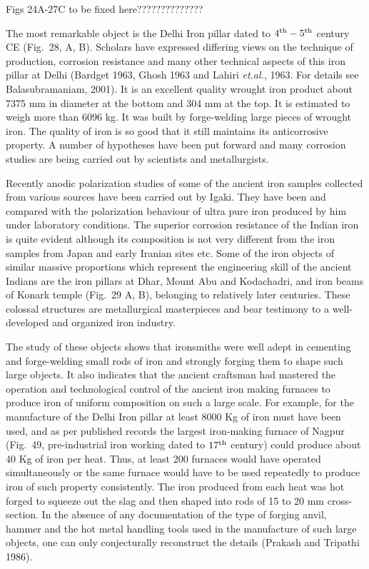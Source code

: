 Figs 24A-27C to be fixed here??????????????


The most remarkable object is the Delhi Iron pillar dated to $4^{\rm th} -5^{\rm th}$ century CE (Fig.~28, A, B). Scholars have expressed differing views on the technique of production, corrosion resistance and many other technical aspects of this iron pillar at Delhi (Bardget 1963, Ghosh 1963 and Lahiri {\it et.al.}, 1963. For details see Balasubramaniam, 2001). It is an excellent quality wrought iron product about 7375 mm in diameter at the bottom and 304 mm at the top. It is estimated to weigh more than 6096 kg. It was built by forge-welding large pieces of wrought iron. The quality of iron is so good that it still maintains its anticorrosive property. A number of hypotheses have been put forward and many corrosion studies are being carried out by scientists and metallurgists. 

Recently anodic polarization studies of some of the ancient iron samples collected from various sources have been carried out by Igaki. They have been and compared with the polarization behaviour of ultra pure iron produced by him under laboratory conditions. The superior corrosion resistance of the Indian iron is quite evident although its composition is not very different from the iron samples from Japan and early Iranian sites etc. Some of the iron objects of similar massive proportions which represent the engineering skill of the ancient Indians are the iron pillars at Dhar, Mount Abu and Kodachadri, and iron beams of Konark temple (Fig.~29 A, B), belonging to relatively later centuries. These colossal structures are metallurgical masterpieces and bear testimony to a well-developed and organized iron industry.

The study of these objects shows that ironsmiths were well adept in cementing and forge-welding small rods of iron and strongly forging them to shape such large objects. It also indicates that the ancient craftsman had mastered the operation and technological control of the ancient iron making furnaces to produce iron of uniform composition on such a large scale. For example, for the manufacture of the Delhi Iron pillar at least 8000 Kg of iron must have been used, and as per published records the largest iron-making furnace of Nagpur (Fig.~49, pre-industrial iron working dated to $17^{\rm th}$ century) could produce about 40 Kg of iron per heat. Thus, at least 200 furnaces would have operated simultaneously or the same furnace would have to be used repeatedly to produce iron of such property consistently. The iron produced from each heat was hot forged to squeeze out the slag and then shaped into rods of 15 to 20 mm cross-section. In the absence of any documentation of the type of forging anvil, hammer and the hot metal handling tools used in the manufacture of such large objects, one can only conjecturally reconstruct the details (Prakash and Tripathi 1986). 

